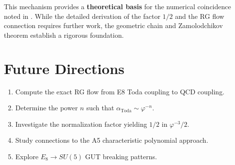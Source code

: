 \documentclass{article}
\begin{document}
This mechanism provides a \textbf{theoretical basis} for the numerical coincidence noted in \cite{vasilev2026}. While the detailed derivation of the factor $1/2$ and the RG flow connection requires further work, the geometric chain and Zamolodchikov theorem establish a rigorous foundation.

\section{Future Directions}

\begin{enumerate}
    \item Compute the exact RG flow from E8 Toda coupling to QCD coupling.
    \item Determine the power $n$ such that $\alpha_{\text{Toda}} \sim \varphi^{-n}$.
    \item Investigate the normalization factor yielding $1/2$ in $\varphi^{-3}/2$.
    \item Study connections to the A5 characteristic polynomial approach.
    \item Explore $E_8 \to SU(5)$ GUT breaking patterns.
\end{enumerate}



\end{document}
